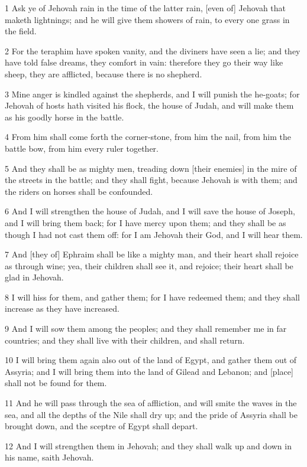 \par 1 Ask ye of Jehovah rain in the time of the latter rain, [even of] Jehovah that maketh lightnings; and he will give them showers of rain, to every one grass in the field.
\par 2 For the teraphim have spoken vanity, and the diviners have seen a lie; and they have told false dreams, they comfort in vain: therefore they go their way like sheep, they are afflicted, because there is no shepherd.
\par 3 Mine anger is kindled against the shepherds, and I will punish the he-goats; for Jehovah of hosts hath visited his flock, the house of Judah, and will make them as his goodly horse in the battle.
\par 4 From him shall come forth the corner-stone, from him the nail, from him the battle bow, from him every ruler together.
\par 5 And they shall be as mighty men, treading down [their enemies] in the mire of the streets in the battle; and they shall fight, because Jehovah is with them; and the riders on horses shall be confounded.
\par 6 And I will strengthen the house of Judah, and I will save the house of Joseph, and I will bring them back; for I have mercy upon them; and they shall be as though I had not cast them off: for I am Jehovah their God, and I will hear them.
\par 7 And [they of] Ephraim shall be like a mighty man, and their heart shall rejoice as through wine; yea, their children shall see it, and rejoice; their heart shall be glad in Jehovah.
\par 8 I will hiss for them, and gather them; for I have redeemed them; and they shall increase as they have increased.
\par 9 And I will sow them among the peoples; and they shall remember me in far countries; and they shall live with their children, and shall return.
\par 10 I will bring them again also out of the land of Egypt, and gather them out of Assyria; and I will bring them into the land of Gilead and Lebanon; and [place] shall not be found for them.
\par 11 And he will pass through the sea of affliction, and will smite the waves in the sea, and all the depths of the Nile shall dry up; and the pride of Assyria shall be brought down, and the sceptre of Egypt shall depart.
\par 12 And I will strengthen them in Jehovah; and they shall walk up and down in his name, saith Jehovah.

